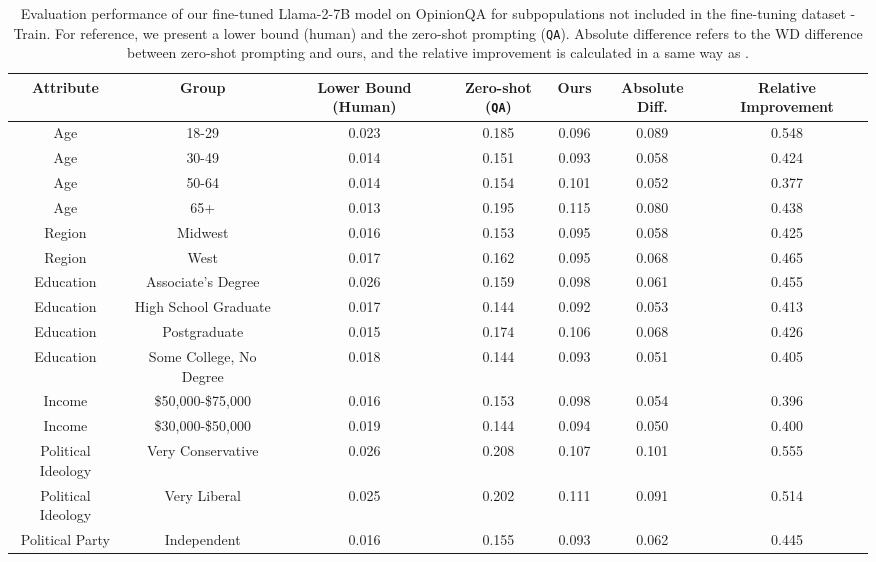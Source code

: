 \begin{table*}[ht]
    \centering
    \scriptsize
    \captionsetup{font=small}
    \caption{
    Evaluation performance of our fine-tuned Llama-2-7B model on OpinionQA for subpopulations not included in the fine-tuning dataset \OURDATA-Train.
    For reference, we present a lower bound (human)
    and the zero-shot prompting (\texttt{QA}).
    Absolute difference refers to the WD difference between zero-shot prompting and ours,
    and the relative improvement is calculated in a same way as .
    }
    \label{table:unseen_demographic_all}
    \begin{tabular}{cc ccc cc}
    \toprule
      \textbf{Attribute}
    & \textbf{Group}
    & \textbf{Lower Bound (Human)}
    & \textbf{Zero-shot (\texttt{QA})}
    & \textbf{Ours}
    & \textbf{Absolute Diff.}
    & \textbf{Relative Improvement}
    \\
    \midrule
    Age & 18-29 & 0.023 & 0.185 & 0.096 & 0.089 & 0.548 \\
    Age & 30-49 & 0.014 & 0.151 & 0.093 & 0.058 & 0.424 \\
    Age & 50-64 & 0.014 & 0.154 & 0.101 & 0.052 & 0.377 \\
    Age & 65+ & 0.013 & 0.195 & 0.115 & 0.080 & 0.438 \\
    Region & Midwest & 0.016 & 0.153 & 0.095 & 0.058 & 0.425 \\
    Region & West & 0.017 & 0.162 & 0.095 & 0.068 & 0.465 \\
    Education & Associate's Degree & 0.026 & 0.159 & 0.098 & 0.061 & 0.455 \\
    Education & High School Graduate & 0.017 & 0.144 & 0.092 & 0.053 & 0.413 \\
    Education & Postgraduate & 0.015 & 0.174 & 0.106 & 0.068 & 0.426 \\
    Education & Some College, No Degree & 0.018 & 0.144 & 0.093 & 0.051 & 0.405 \\
    Income & \$50,000-\$75,000 & 0.016 & 0.153 & 0.098 & 0.054 & 0.396 \\
    Income & \$30,000-\$50,000 & 0.019 & 0.144 & 0.094 & 0.050 & 0.400 \\
    Political Ideology & Very Conservative & 0.026 & 0.208 & 0.107 & 0.101 & 0.555 \\
    Political Ideology & Very Liberal & 0.025 & 0.202 & 0.111 & 0.091 & 0.514 \\
    Political Party & Independent & 0.016 & 0.155 & 0.093 & 0.062 & 0.445 \\

\end{tabular}
\end{table*}
